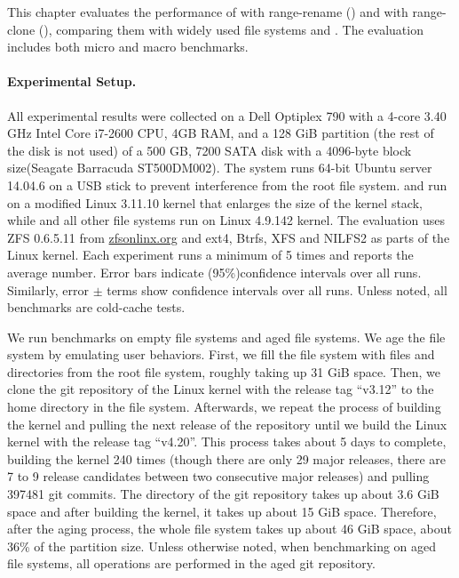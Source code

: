 \label{chap:eval}

This chapter evaluates the performance of \betrfs with
range-rename (\betrfsFour) and \betrfs with range-clone (\betrfsFive),
comparing them with widely used file systems and \betrfsThree.
The evaluation includes both micro and macro benchmarks.

\paragraph{Experimental Setup.}

All experimental results were collected on
a Dell Optiplex 790 with a 4-core 3.40 GHz Intel Core i7-2600 CPU,
4GB RAM,
and a 128 GiB partition (the rest of the disk is not used)
of a 500 GB, 7200 SATA disk with a 4096-byte block size(Seagate Barracuda ST500DM002).
The system runs 64-bit Ubuntu server 14.04.6 on a USB stick to prevent
interference from the root file system.
\betrfsThree and \betrfsFour run on a modified Linux 3.11.10 kernel that
enlarges the size of the kernel stack,
while \betrfsFive and all other file systems run on Linux 4.9.142 kernel.
The evaluation uses ZFS 0.6.5.11 from \url{zfsonlinx.org} and
ext4, Btrfs, XFS and NILFS2 as parts of the Linux kernel.
Each experiment runs a minimum of 5 times and reports the average number.
Error bars indicate (95\%)confidence intervals over all runs.
Similarly, error $\pm$ terms show confidence intervals over all runs.
Unless noted, all benchmarks are cold-cache tests.

We run benchmarks on empty file systems and aged file systems.
We age the file system by emulating user behaviors.
First, we fill the file system with files and directories from the root file
system, roughly taking up 31 GiB space.
Then, we clone the git repository of the Linux kernel with the release tag
``v3.12'' to the home directory in the file system.
Afterwards, we repeat the process of building the kernel and pulling the next
release of the repository
until we build the Linux kernel with the release tag ``v4.20''.
This process takes about 5 days to complete, building the kernel 240 times
(though there are only 29 major releases, there are 7 to 9 release candidates
between two consecutive major releases)
and pulling 397481 git commits.
The directory of the git repository takes up about 3.6 GiB space and
after building the kernel, it takes up about 15 GiB space.
Therefore, after the aging process, the whole file system takes up about 46 GiB
space, about 36\% of the partition size.
Unless otherwise noted, when benchmarking on aged file systems,
all operations are performed in the aged git repository.

